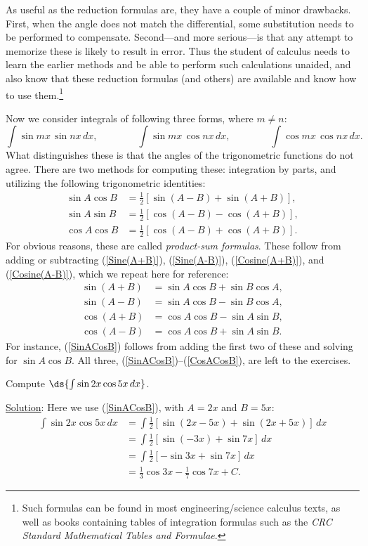 As useful as the reduction formulas are, they have a couple of
minor drawbacks.  First, when the angle does not match the differential,
some substitution needs to be performed to compensate.
Second---and more serious---is that any attempt to memorize these is likely
to result in error.  Thus the student of calculus needs to learn
the earlier methods and be able to perform such calculations
unaided, and also know that these reduction formulas (and others)
are available and know how to use them.\footnote{%
Such formulas can be found in most engineering/science calculus
texts, as well as books containing tables of integration formulas
such as the {\it CRC Standard Mathematical Tables and Formulae}.
}

Now we consider integrals of following three forms, where $m\ne n$:
$$\int\sin mx\,\sin nx\,dx,
\qquad\qquad
\int\sin mx\,\cos nx\,dx,
\qquad\qquad
\int\cos mx\,\cos nx\,dx.$$
What distinguishes these is that the angles of the trigonometric functions
do not agree.  There are two methods for computing these:
integration by parts, and utilizing the following trigonometric identities:
\begin{align}
\sin A\cos B&=\frac12\left[\sin(A-B)+\sin(A+B)\right],\label{SinACosB}\\
\sin A\sin B&=\frac12\left[\cos(A-B)-\cos(A+B)\right],\label{SinASinB}\\
\cos A\cos B&=\frac12\left[\cos(A-B)+\cos(A+B)\right].\label{CosACosB}
\end{align}
For obvious reasons, these are called {\it product-sum formulas}.
These follow from adding or subtracting
(\ref{Sine(A+B)}), (\ref{Sine(A-B)}), (\ref{Cosine(A+B)}),
and (\ref{Cosine(A-B)}), which we repeat here for reference:
\begin{align*}
\sin(A+B)&=\sin A\cos B+\sin B\cos A,\\
\sin(A-B)&=\sin A\cos B-\sin B\cos A,\\
\cos(A+B)&=\cos A\cos B-\sin A\sin B,\\
\cos(A-B)&=\cos A\cos B+\sin A\sin B.\end{align*}
For instance, (\ref{SinACosB}) follows from adding the
first two of these and solving for $\sin A\cos B$.  All
three, (\ref{SinACosB})--(\ref{CosACosB}), are left 
to the exercises.

\bex Compute $\ds{\int\sin2x\cos5x\,dx}$.

\underline{Solution}: Here we use (\ref{SinACosB}),
with $A=2x$ and $B=5x$:
\begin{align*}
\int\sin2x\cos5x\,dx&=\int\frac12[\sin(2x-5x)+\sin(2x+5x)]\,dx\\
                    &=\int\frac12[\sin(-3x)+\sin7x]\,dx\\
                    &=\int\frac12[-\sin3x+\sin7x]\,dx\\
                    &=\frac13\cos3x-\frac17\cos7x+C.\end{align*}
\eex

